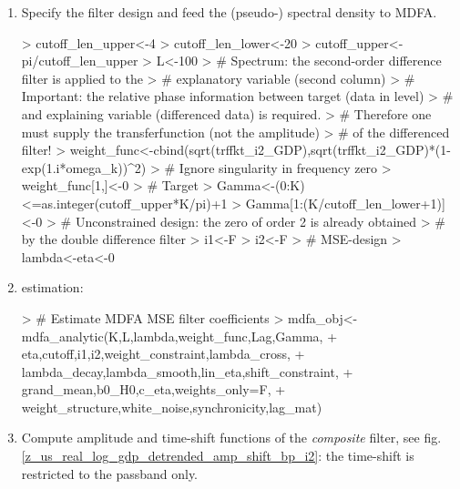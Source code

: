 \documentclass[a4paper]{book}
\begin{document}
\begin{enumerate}
\item Specify the filter design and feed the (pseudo-) spectral density to MDFA.
\begin{Schunk}
\begin{Sinput}
> cutoff_len_upper<-4
> cutoff_len_lower<-20
> cutoff_upper<-pi/cutoff_len_upper
> L<-100
> # Spectrum: the second-order difference filter is applied to the 
> # explanatory variable (second column) 
> #   Important: the relative phase information between target (data in level)
> #   and explaining variable (differenced data) is required.
> #   Therefore one must supply the transferfunction (not the amplitude) 
> #   of the differenced filter!
> weight_func<-cbind(sqrt(trffkt_i2_GDP),sqrt(trffkt_i2_GDP)*(1-exp(1.i*omega_k))^2)
> # Ignore singularity in frequency zero
> weight_func[1,]<-0
> # Target
> Gamma<-(0:K)<=as.integer(cutoff_upper*K/pi)+1
> Gamma[1:(K/cutoff_len_lower+1)]<-0
> # Unconstrained design: the zero of order 2 is already obtained
> #   by the double difference filter
> i1<-F
> i2<-F
> # MSE-design
> lambda<-eta<-0
\end{Sinput}
\end{Schunk}
\item estimation:
\begin{Schunk}
\begin{Sinput}
> # Estimate MDFA MSE filter coefficients  
> mdfa_obj<-mdfa_analytic(K,L,lambda,weight_func,Lag,Gamma,
+               eta,cutoff,i1,i2,weight_constraint,lambda_cross,
+               lambda_decay,lambda_smooth,lin_eta,shift_constraint,
+               grand_mean,b0_H0,c_eta,weights_only=F,
+               weight_structure,white_noise,synchronicity,lag_mat)
\end{Sinput}
\end{Schunk}
\item Compute amplitude and time-shift functions of the \emph{composite} filter, see fig.\ref{z_us_real_log_gdp_detrended_amp_shift_bp_i2}: the time-shift is restricted to the passband only.

\end{enumerate}
\end{document}
